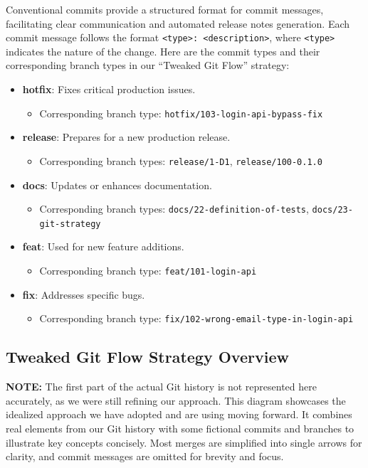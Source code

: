 Conventional commits provide a structured format for commit messages, facilitating clear communication and automated release notes generation. Each commit message follows the format \texttt{<type>: <description>}, where \texttt{<type>} indicates the nature of the change. Here are the commit types and their corresponding branch types in our ``Tweaked Git Flow'' strategy:

\begin{itemize}
	\item \textbf{hotfix}: Fixes critical production issues.
	\begin{itemize}
		\item Corresponding branch type: \texttt{hotfix/103-login-api-bypass-fix}
	\end{itemize}
	\item \textbf{release}: Prepares for a new production release.
	\begin{itemize}
		\item Corresponding branch types: \texttt{release/1-D1}, \texttt{release/100-0.1.0}
	\end{itemize}
	\item \textbf{docs}: Updates or enhances documentation.
	\begin{itemize}
		\item Corresponding branch types: \texttt{docs/22-definition-of-tests}, \texttt{docs/23-git-strategy}
	\end{itemize}
	\item \textbf{feat}: Used for new feature additions.
	\begin{itemize}
		\item Corresponding branch type: \texttt{feat/101-login-api}
	\end{itemize}
	\item \textbf{fix}: Addresses specific bugs.
	\begin{itemize}
		\item Corresponding branch type: \texttt{fix/102-wrong-email-type-in-login-api}
	\end{itemize}
\end{itemize}
	
\subsection{Tweaked Git Flow Strategy Overview}

\noindent \textbf{NOTE:} The first part of the actual Git history is not represented here accurately, as we were still refining our approach. This diagram showcases the idealized approach we have adopted and are using moving forward. It combines real elements from our Git history with some fictional commits and branches to illustrate key concepts concisely. Most merges are simplified into single arrows for clarity, and commit messages are omitted for brevity and focus.

